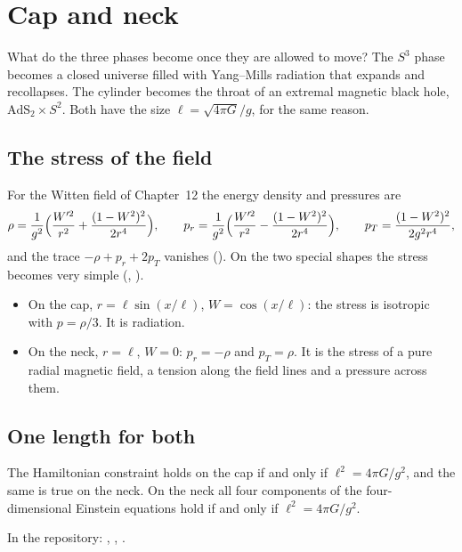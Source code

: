 \chapter{Cap and neck}\label{ch:capneck}

\begin{questionbox}
What do the three phases become once they are allowed to move? The $S^3$ phase becomes a closed universe filled with Yang--Mills radiation that expands and recollapses. The cylinder becomes the throat of an extremal magnetic black hole, $\mathrm{AdS}_2\times S^2$. Both have the size $\ell=\sqrt{4\pi G}/g$, for the same reason.
\end{questionbox}

\section{The stress of the field}

For the Witten field of Chapter~12 the energy density and pressures are
\[
\rho=\frac1{g^2}\Bigl(\frac{W'^2}{r^2}+\frac{(1-W^2)^2}{2r^4}\Bigr),\qquad
p_r=\frac1{g^2}\Bigl(\frac{W'^2}{r^2}-\frac{(1-W^2)^2}{2r^4}\Bigr),\qquad
p_T=\frac{(1-W^2)^2}{2g^2r^4},
\]
and the trace $-\rho+p_r+2p_T$ vanishes (). On the two special shapes the stress becomes very simple (, ).
\begin{itemize}[leftmargin=*]
\item On the cap, $r=\ell\sin(x/\ell)$, $W=\cos(x/\ell)$: the stress is isotropic with $p=\rho/3$. It is radiation.
\item On the neck, $r=\ell$, $W=0$: $p_r=-\rho$ and $p_T=\rho$. It is the stress of a pure radial magnetic field, a tension along the field lines and a pressure across them.
\end{itemize}

\section{One length for both}

\begin{theorem}\proved\label{thm:ell}
The Hamiltonian constraint holds on the cap if and only if $\ell^2=4\pi G/g^2$, and the same is true on the neck. On the neck all four components of the four-dimensional Einstein equations hold if and only if $\ell^2=4\pi G/g^2$.
\end{theorem}
\noindent In the repository: , , .

